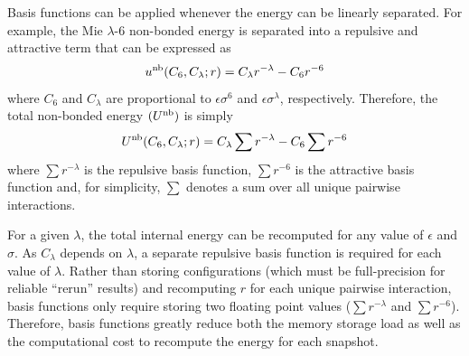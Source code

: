 \documentclass[journal=jced,manuscript=article]{achemso}
\begin{document}
Basis functions can be applied whenever the energy can be linearly separated. For example, the Mie $\lambda$-6 non-bonded energy is separated into a repulsive and attractive term that can be expressed as
\begin{equation} \label{Mie basis function}
u^{\rm nb}(C_6,C_\lambda;r) = C_\lambda r^{-\lambda} - C_6 r^{-6}
\end{equation} 
where $C_6$ and $C_\lambda$ are proportional to $\epsilon \sigma^6$ and $\epsilon \sigma^\lambda$, respectively. Therefore, the total non-bonded energy $(U^{\rm nb})$ is simply
\begin{equation} \label{Utotal basis function}
U^{\rm nb}(C_6,C_\lambda;r) = C_\lambda \sum r^{-\lambda} - C_6 \sum r^{-6}
\end{equation}
where $\sum r^{-\lambda}$ is the repulsive basis function, $\sum r^{-6}$ is the attractive basis function and, for simplicity, $\sum$ denotes a sum over all unique pairwise interactions.

For a given $\lambda$, the total internal energy can be recomputed for any value of $\epsilon$ and $\sigma$. As $C_\lambda$ depends on $\lambda$, a separate repulsive basis function is required for each value of $\lambda$. Rather than storing configurations (which must be full-precision for reliable ``rerun'' results) and recomputing $r$ for each unique pairwise interaction, basis functions only require storing two floating point values ($\sum r^{-\lambda}$ and $\sum r^{-6}$). Therefore, basis functions greatly reduce both the memory storage load as well as the computational cost to recompute the energy for each snapshot. 


\end{document}
